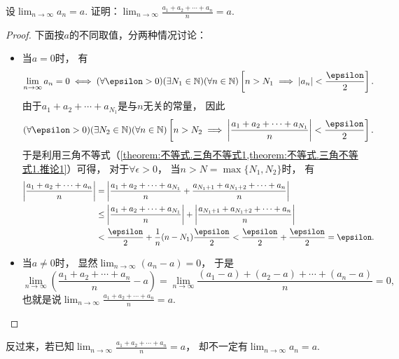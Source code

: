 \begin{example}\label{example:极限.数列的算术平均的极限}
设\(\lim_{n\to\infty} a_n = a\).
证明：\(\lim_{n\to\infty} \frac{a_1+a_2+\dotsb+a_n}{n} = a\).
\begin{proof}
下面按\(a\)的不同取值，分两种情况讨论：
\begin{itemize}
	\item 当\(a=0\)时，
	有\begin{equation*}
		\lim_{n\to\infty} a_n = 0
		\iff
		(\forall\epsilon>0)
		(\exists N_1\in\mathbb{N})
		(\forall n\in\mathbb{N})
		\left[n>N_1 \implies \abs{a_n}<\frac\epsilon2\right].
	\end{equation*}
	由于\(a_1 + a_2 + \dotsb + a_{N_1}\)是与\(n\)无关的常量，
	因此\begin{equation*}
		(\forall\epsilon>0)
		(\exists N_2\in\mathbb{N})
		(\forall n\in\mathbb{N})
		\left[
			n>N_2
			\implies
			\abs{\frac{a_1 + a_2 + \dotsb + a_{N_1}}{n}} < \frac\epsilon2
		\right].
	\end{equation*}
	于是利用三角不等式（\cref{theorem:不等式.三角不等式1,theorem:不等式.三角不等式1.推论1}）可得，
	对于\(\forall\epsilon>0\)，
	当\(n>N=\max\{N_1,N_2\}\)时，
	有\begin{align*}
		\abs{\frac{a_1 + a_2 + \dotsb + a_n}{n}}
		&= \abs{
			\frac{a_1 + a_2 + \dotsb + a_{N_1}}{n}
			+ \frac{a_{N_1+1} + a_{N_1+2} + \dotsb + a_n}{n}
		} \\
		&\leq \abs{\frac{a_1 + a_2 + \dotsb + a_{N_1}}{n}}
		+ \abs{\frac{a_{N_1+1} + a_{N_1+2} + \dotsb + a_n}{n}} \\
		&< \frac\epsilon2 + \frac1n (n-N_1) \frac\epsilon2
		< \frac\epsilon2 + \frac\epsilon2
		= \epsilon.
	\end{align*}

	\item 当\(a\neq0\)时，
	显然\(\lim_{n\to\infty} (a_n - a) = 0\)，
	于是\begin{equation*}
		\lim_{n\to\infty} \left(\frac{a_1+a_2+\dotsb+a_n}{n}-a\right)
		= \lim_{n\to\infty} \frac{(a_1-a)+(a_2-a)+\dotsb+(a_n-a)}{n}
		= 0,
	\end{equation*}
	也就是说\(\lim_{n\to\infty} \frac{a_1+a_2+\dotsb+a_n}{n} = a\).
	\qedhere
\end{itemize}
\end{proof}
\end{example}
\begin{remark}
反过来，若已知\(\lim_{n\to\infty} \frac{a_1+a_2+\dotsb+a_n}{n} = a\)，
却不一定有\(\lim_{n\to\infty} a_n = a\).
\end{remark}

